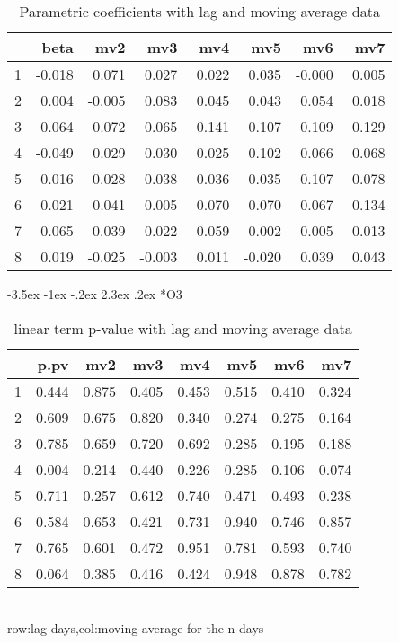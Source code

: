 \documentclass[a4paper, 12pt]{article}
\makeatletter
\def\large{\fontsize{14}{20}\selectfont}
\renewcommand\subsection{\@startsection {subsection}{1}{\z@}%
                                   {-3.5ex \@plus -1ex \@minus -.2ex}%
                                   {2.3ex \@plus.2ex}%
                                   {\centering\normalfont\large\bfseries}}
\makeatother
\begin{document}
\begin{table}[h]
\centering
\caption{Parametric coefficients with lag and moving average data}
\begin{tabular}{rrrrrrrr}
  \hline
 & beta & mv2 & mv3 & mv4 & mv5 & mv6 & mv7 \\
  \hline
1 & -0.018 & 0.071 & 0.027 & 0.022 & 0.035 & -0.000 & 0.005 \\
  2 & 0.004 & -0.005 & 0.083 & 0.045 & 0.043 & 0.054 & 0.018 \\
  3 & 0.064 & 0.072 & 0.065 & 0.141 & 0.107 & 0.109 & 0.129 \\
  4 & -0.049 & 0.029 & 0.030 & 0.025 & 0.102 & 0.066 & 0.068 \\
  5 & 0.016 & -0.028 & 0.038 & 0.036 & 0.035 & 0.107 & 0.078 \\
  6 & 0.021 & 0.041 & 0.005 & 0.070 & 0.070 & 0.067 & 0.134 \\
  7 & -0.065 & -0.039 & -0.022 & -0.059 & -0.002 & -0.005 & -0.013 \\
  8 & 0.019 & -0.025 & -0.003 & 0.011 & -0.020 & 0.039 & 0.043 \\
   \hline
\end{tabular}
\end{table}
\clearpage
\subsection*{O3}
\begin{table}[h]
\centering
\caption{linear term p-value with lag and moving average data}
\begin{tabular}{rrrrrrrr}
  \hline
 & p.pv & mv2 & mv3 & mv4 & mv5 & mv6 & mv7 \\
  \hline
1 & 0.444 & 0.875 & 0.405 & 0.453 & 0.515 & 0.410 & 0.324 \\
  2 & 0.609 & 0.675 & 0.820 & 0.340 & 0.274 & 0.275 & 0.164 \\
  3 & 0.785 & 0.659 & 0.720 & 0.692 & 0.285 & 0.195 & 0.188 \\
  4 & 0.004 & 0.214 & 0.440 & 0.226 & 0.285 & 0.106 & 0.074 \\
  5 & 0.711 & 0.257 & 0.612 & 0.740 & 0.471 & 0.493 & 0.238 \\
  6 & 0.584 & 0.653 & 0.421 & 0.731 & 0.940 & 0.746 & 0.857 \\
  7 & 0.765 & 0.601 & 0.472 & 0.951 & 0.781 & 0.593 & 0.740 \\
  8 & 0.064 & 0.385 & 0.416 & 0.424 & 0.948 & 0.878 & 0.782 \\
   \hline
\end{tabular}
\\row:lag days,col:moving average for the n days
\end{table}
\end{document}

